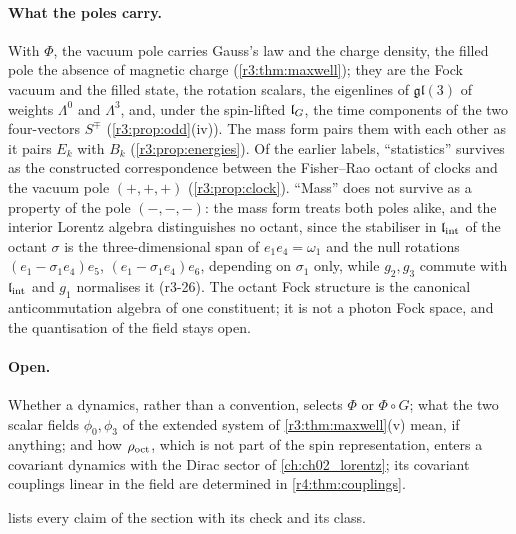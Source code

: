 \paragraph{What the poles carry.} With $\Phi$, the vacuum pole carries Gauss's law and the charge density, the filled pole the absence of
magnetic charge (\cref{r3:thm:maxwell}); they are the Fock vacuum and the filled state, the rotation scalars, the eigenlines of $\mathfrak{gl}(3)$ of
weights $\Lambda^0$ and $\Lambda^3$, and, under the spin-lifted $\mathfrak l_G$, the time components of the two four-vectors $S^\mp$ (\cref{r3:prop:odd}(iv)).
The mass form pairs them with each other as it pairs $E_k$ with $B_k$ (\cref{r3:prop:energies}). Of the earlier labels, ``statistics'' survives as
the constructed correspondence between the Fisher--Rao octant of clocks and the vacuum pole $(+,+,+)$ (\cref{r3:prop:clock}). ``Mass'' does not
survive as a property of the pole $(-,-,-)$: the mass form treats both poles alike, and the interior Lorentz algebra distinguishes no octant,
since the stabiliser in $\mathfrak l_{\rm int}$ of the octant $\sigma$ is the three-dimensional span of $e_1e_4=\omega_1$ and the null rotations
$(e_1-\sigma_1e_4)e_5$, $(e_1-\sigma_1e_4)e_6$, depending on $\sigma_1$ only, while $g_2,g_3$ commute with $\mathfrak l_{\rm int}$ and $g_1$ normalises it (r3-26). The
octant Fock structure is the canonical anticommutation algebra of one constituent; it is not a photon Fock space, and the quantisation of the
field stays open.

\paragraph{Open.} Whether a dynamics, rather than a convention, selects $\Phi$ or $\Phi\circ G$; what the two scalar fields $\phi_0,\phi_3$ of the
extended system of \cref{r3:thm:maxwell}(v) mean, if anything; and how $\rho_{\rm oct}$, which is not part of the spin representation, enters a covariant
dynamics with the Dirac sector of \cref{ch:ch02_lorentz}; its covariant couplings linear in the field are determined in \cref{r4:thm:couplings}.

 lists every claim of the section with its check and its class.

